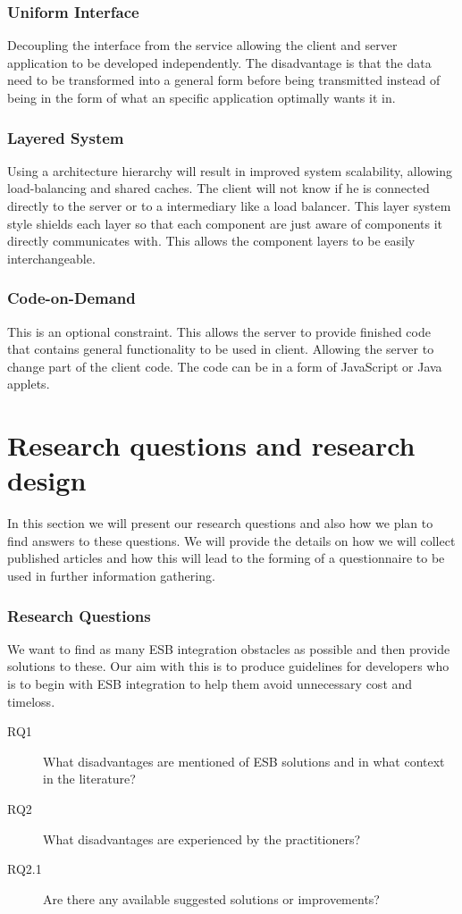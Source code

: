 \documentclass{llncs}
\begin{document}
\subsubsection{Uniform Interface}
Decoupling the interface from the service allowing the client and server application to be developed  independently. The disadvantage is that the data need to be transformed into a general form before being transmitted instead of being in the form of what an specific application optimally wants it in.

\subsubsection{Layered System}
Using a architecture hierarchy will result in improved system scalability, allowing load-balancing and shared caches. The client will not know if he is connected directly to the server or to a intermediary like a load balancer. This layer system style shields each layer so that each component are just aware of components it directly communicates with. This allows the component layers to be easily interchangeable.

\subsubsection{Code-on-Demand}
This is an optional constraint. This allows the server to provide finished code that contains general functionality to be used in client. Allowing the server to change part of the client code. The code can be in a form of JavaScript or Java applets.

\section{Research questions and research design}
In this section we will present our research questions and also how we plan to find answers to these questions. We will provide the details on how we will collect published articles and how this will lead to the forming of a questionnaire to be used in further information gathering.
\subsubsection{Research Questions}
We want to find as many ESB integration obstacles as possible and then provide solutions to these. Our aim with this is to produce guidelines for developers who is to begin with ESB integration to help them avoid unnecessary cost and timeloss.
\begin{description}
\item[RQ1] What disadvantages are mentioned of ESB solutions and in what context in the literature?
\item[RQ2] What disadvantages are experienced by the practitioners?
\item[RQ2.1] Are there any available suggested solutions or improvements?
\end{description}
\end{document}
